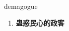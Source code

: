 
\begin{frame}
{\huge demagogue}
\begin{center}
\begin{enumerate}\Large
  \item \textbf{蛊惑民心的政客}
\end{enumerate}
\end{center}
\end{frame}
